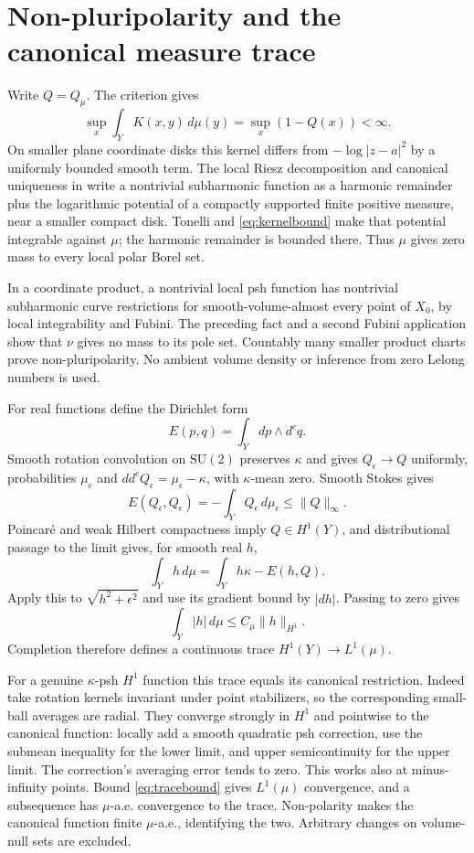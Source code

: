 \documentclass[11pt]{article}
\newcommand{\ddc}{dd^c}
\newcommand{\dc}{d^c}
\theoremstyle{remark}\newtheorem{remark}[theorem]{Remark}
\begin{document}
\section{Non-pluripolarity and the canonical measure trace}
Write $Q=Q_\mu$. The criterion gives
\begin{equation}\label{eq:kernelbound}
 \sup_x\int_YK(x,y)\,d\mu(y)=\sup_x(1-Q(x))<\infty.
\end{equation}
On smaller plane coordinate disks this kernel differs from
$-\log|z-a|^2$ by a uniformly bounded smooth term. The local Riesz
decomposition and canonical uniqueness in \cite[I.4.20--4.21]{Dem}
write a nontrivial subharmonic function as a harmonic remainder plus
the logarithmic potential of a compactly supported finite positive
measure, near a smaller compact disk. Tonelli and
\eqref{eq:kernelbound} make that potential integrable against $\mu$;
the harmonic remainder is bounded there. Thus $\mu$ gives zero mass
to every local polar Borel set.

In a coordinate product, a nontrivial local psh function has nontrivial
subharmonic curve restrictions for smooth-volume-almost every point of
$X_0$, by local integrability and Fubini. The preceding fact and a
second Fubini application show that $\nu$ gives no mass to its pole
set. Countably many smaller product charts prove non-pluripolarity.
No ambient volume density or inference from zero Lelong numbers is used.

For real functions define the Dirichlet form
\[
 E(p,q)=\int_Y dp\wedge\dc q.
\]
Smooth rotation convolution on $\mathrm{SU}(2)$ preserves $\kappa$ and
gives $Q_\epsilon\to Q$ uniformly, probabilities $\mu_\epsilon$ and
$\ddc Q_\epsilon=\mu_\epsilon-\kappa$, with $\kappa$-mean zero.
Smooth Stokes gives
\[
 E(Q_\epsilon,Q_\epsilon)
 =-\int_YQ_\epsilon\,d\mu_\epsilon\leq\|Q\|_\infty.
\]
Poincar\'e and weak Hilbert compactness imply $Q\in H^1(Y)$, and
distributional passage to the limit gives, for smooth real $h$,
\begin{equation}\label{eq:traceidentity}
 \int_Yh\,d\mu=\int_Yh\kappa-E(h,Q).
\end{equation}
Apply this to $\sqrt{h^2+\epsilon^2}$ and use its gradient bound by
$|dh|$. Passing to zero gives
\begin{equation}\label{eq:tracebound}
 \int_Y|h|\,d\mu\leq C_\mu\|h\|_{H^1}.
\end{equation}
Completion therefore defines a continuous trace
$H^1(Y)\to L^1(\mu)$.

For a genuine $\kappa$-psh $H^1$ function this trace equals its canonical
restriction. Indeed take rotation kernels invariant under point
stabilizers, so the corresponding small-ball averages are radial.
They converge strongly in $H^1$ and pointwise to the canonical function:
locally add a smooth quadratic psh correction, use the submean inequality
for the lower limit, and upper semicontinuity for the upper limit.
The correction's averaging error tends to zero. This works also at
minus-infinity points. Bound \eqref{eq:tracebound} gives $L^1(\mu)$
convergence, and a subsequence has $\mu$-a.e. convergence to the trace.
Non-polarity makes the canonical function finite $\mu$-a.e., identifying
the two. Arbitrary changes on volume-null sets are excluded.
\end{document}
